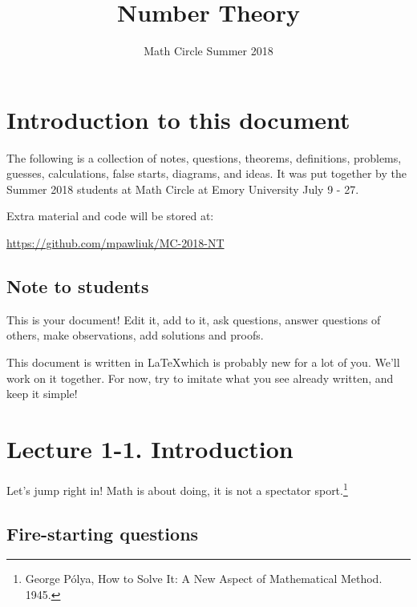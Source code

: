 \documentclass[11pt]{article}
\theoremstyle{definition}
\numberwithin{thm}{section}
\begin{document}
\title{Number Theory}
\author{Math Circle Summer 2018}

\maketitle

\section{Introduction to this document}

The following is a collection of notes, questions, theorems, definitions, problems, guesses, calculations, false starts, diagrams, and ideas. It was put together by the Summer 2018 students at Math Circle at Emory University July 9 - 27.

Extra material and code will be stored at:
\begin{center}
	\url{https://github.com/mpawliuk/MC-2018-NT}
\end{center}

\subsection{Note to students}

This is your document! Edit it, add to it, ask questions, answer questions of others, make observations, add solutions and proofs.

This document is written in \LaTeX which is probably new for a lot of you. We'll work on it together. For now, try to imitate what you see already written, and keep it simple!

\newpage
\section{Lecture 1-1. Introduction} 

Let's jump right in! Math is about doing, it is not a spectator sport.\footnote{George P\' olya, How to Solve It: A New Aspect of Mathematical Method. 1945.}


\subsection{Fire-starting questions}
\end{document}
